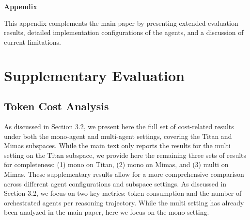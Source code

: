 \documentclass{article}
\begin{document}


\appendix
\textbf{Appendix}

This appendix complements the main paper by presenting extended evaluation results, detailed implementation configurations of the agents, and a discussion of current limitations.

\section{Supplementary Evaluation}
\subsection{Token Cost Analysis}
\label{cost evaluation}

As discussed in Section 3.2, we present here the full set of cost-related results under both the mono-agent and multi-agent settings, covering the Titan and Mimas subspaces. While the main text only reports the results for the multi setting on the Titan subspace, we provide here the remaining three sets of results for completeness: (1) mono on Titan, (2) mono on Mimas, and (3) multi on Mimas. These supplementary results allow for a more comprehensive comparison across different agent configurations and subspace settings.
As discussed in Section 3.2, we focus on two key metrics: token consumption and the number of orchestrated agents per reasoning trajectory. While the multi setting has already been analyzed in the main paper, here we focus on the mono setting.
\end{document}
